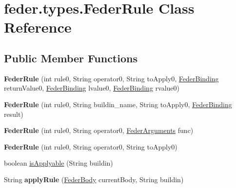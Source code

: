 \hypertarget{classfeder_1_1types_1_1FederRule}{}\section{feder.\+types.\+Feder\+Rule Class Reference}
\label{classfeder_1_1types_1_1FederRule}
\subsection*{Public Member Functions}
\begin{DoxyCompactItemize}
\item 
\mbox{\label{classfeder_1_1types_1_1FederRule_a8ee9a0e9afcfda997e4319488e399aa2}} 
{\bfseries Feder\+Rule} (int rule0, String operator0, String to\+Apply0, \hyperlink{classfeder_1_1types_1_1FederBinding}{Feder\+Binding} return\+Value0, \hyperlink{classfeder_1_1types_1_1FederBinding}{Feder\+Binding} lvalue0, \hyperlink{classfeder_1_1types_1_1FederBinding}{Feder\+Binding} rvalue0)
\item 
\mbox{\label{classfeder_1_1types_1_1FederRule_a1ea7da26513e2295dc7d5ae8a7d7dcc1}} 
{\bfseries Feder\+Rule} (int rule0, String buildin\+\_\+name, String to\+Apply0, \hyperlink{classfeder_1_1types_1_1FederBinding}{Feder\+Binding} result)
\item 
\mbox{\label{classfeder_1_1types_1_1FederRule_a49becaf0f19cff6aeb71097e365e254a}} 
{\bfseries Feder\+Rule} (int rule0, String operator0, \hyperlink{interfacefeder_1_1types_1_1FederArguments}{Feder\+Arguments} func)
\item 
\mbox{\label{classfeder_1_1types_1_1FederRule_a1c179e28c0f5def95a910cbd138f0bfb}} 
{\bfseries Feder\+Rule} (int rule0, String operator0, String to\+Apply0)
\item 
boolean \hyperlink{classfeder_1_1types_1_1FederRule_afcc217a0afa07a0a6eb6a3bbe3cfb70a}{is\+Applyable} (String buildin)
\item 
\mbox{\label{classfeder_1_1types_1_1FederRule_a7677e9211a5c4e4edd62462c85a437c5}} 
String {\bfseries apply\+Rule} (\hyperlink{classfeder_1_1types_1_1FederBody}{Feder\+Body} current\+Body, String buildin)

\end{DoxyCompactItemize}
